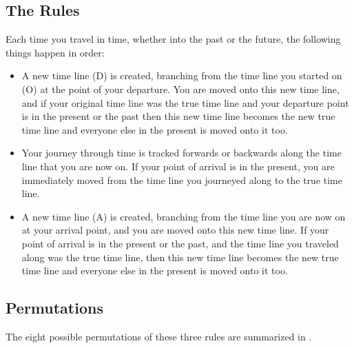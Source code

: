 \begin{multicols*}{2}
\subsection{The Rules}
Each time you travel in time, whether into the past or the future, the following things happen in order:

\begin{itemize}
	\item{A new time line (D) is created, branching from the time line you started on (O) at the point of your departure. You are moved onto this new time line, and if your original time line was the true time line and your departure point is in the present or the past then this new time line becomes the new true time line and everyone else in the present is moved onto it too.}
	\item{Your journey through time is tracked forwards or backwards along the time line that you are now on. If your point of arrival is in the present, you are immediately moved from the time line you journeyed along to the true time line.}
	\item{A new time line (A) is created, branching from the time line you are now on at your arrival point, and you are moved onto this new time line. If your point of arrival is in the present or the past, and the time line you traveled along was the true time line, then this new time line becomes the new true time line and everyone else in the present is moved onto it too.}
\end{itemize}

\subsection{Permutations}
The eight possible permutations of these three rules are summarized in .

\end{multicols*}
